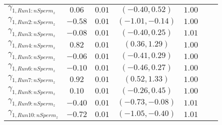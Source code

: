 \documentclass{article}
\begin{document}
\begin{table}[!ht]
\begin{tabular}{l c c c c c c}
$\gamma_{1,Run1:nSperm_z}$   & $ 0.06$ & $0.01$ & $(-0.40, 0.52)$ & $1.00$ \\
$\gamma_{1,Run2:nSperm_z}$   & $-0.58$ & $0.01$ & $(-1.01,-0.14)$ & $1.00$ \\
$\gamma_{1,Run3:nSperm_z}$   & $-0.08$ & $0.01$ & $(-0.40, 0.25)$ & $1.01$ \\
$\gamma_{1,Run4:nSperm_z}$   & $ 0.82$ & $0.01$ & $( 0.36, 1.29)$ & $1.00$ \\
$\gamma_{1,Run5:nSperm_z}$   & $-0.06$ & $0.01$ & $(-0.41, 0.29)$ & $1.00$ \\
$\gamma_{1,Run6:nSperm_z}$   & $-0.10$ & $0.01$ & $(-0.46, 0.27)$ & $1.00$ \\
$\gamma_{1,Run7:nSperm_z}$   & $ 0.92$ & $0.01$ & $( 0.52, 1.33)$ & $1.00$ \\
$\gamma_{1,Run8:nSperm_z}$   & $ 0.10$ & $0.01$ & $(-0.26, 0.45)$ & $1.00$ \\
$\gamma_{1,Run9:nSperm_z}$   & $-0.40$ & $0.01$ & $(-0.73,-0.08)$ & $1.01$ \\
$\gamma_{1,Run10:nSperm_z}$  & $-0.72$ & $0.01$ & $(-1.05,-0.40)$ & $1.01$ \\
\end{tabular}
\end{table}
\newpage
\end{document}
